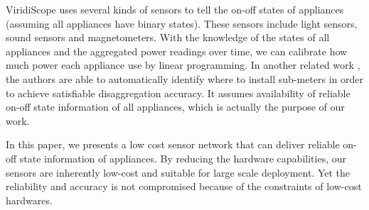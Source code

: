 ViridiScope \cite{Kim2009a} uses several kinds of sensors to tell the on-off states of appliances (assuming all appliances have binary states). These sensors include light sensors, sound sensors and magnetometers. With the knowledge of the states of all appliances and the aggregated power readings over time, we can calibrate how much power each appliance use by linear programming. In another related work \cite{Jung2010}, the authors are able to automatically identify where to install sub-meters in order to achieve satisfiable disaggregation accuracy. It assumes availability of reliable on-off state information of all appliances, which is actually the purpose of our work.

In this paper, we presents a low cost sensor network that can deliver reliable on-off state information of appliances. By reducing the hardware capabilities, our sensors are inherently low-cost and suitable for large scale deployment. Yet the reliability and accuracy is not compromised because of the constraints of low-cost hardwares. 

